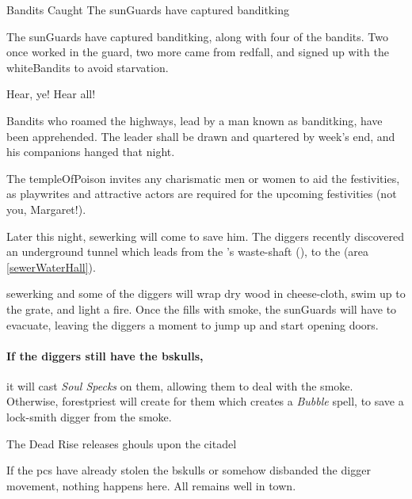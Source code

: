{Bandits Caught}%
{The \glspl{sunGuard} have captured \gls{banditking}}%

\label{banditsCaught}

The \glspl{sunGuard} have captured \gls{banditking}, along with four of the bandits.
Two once worked in the \gls{guard}, two more came from \gls{redfall}, and signed up with the \gls{whiteBandits} to avoid starvation.

\begin{speechtext}
  Hear, ye!  Hear all!

  Bandits who roamed the highways, lead by a man known as \gls{banditking}, have been apprehended.  The leader shall be drawn and quartered by week's end, and his companions hanged that night.

  The \gls{templeOfPoison} invites any charismatic men or women to aid the festivities, as playwrites and attractive actors are required for the upcoming festivities (not you, Margaret!).
\end{speechtext}


Later this night, \gls{sewerking} will come to save him.
The \glspl{digger} recently discovered an underground tunnel which leads from the 's waste-shaft (), to the  (area \vref{sewerWaterHall}).

\Gls{sewerking} and some of the \glspl{digger} will wrap dry wood in cheese-cloth, swim up to the grate, and light a fire.
Once the  fills with smoke, the \glspl{sunGuard} will have to evacuate, leaving the \glspl{digger} a moment to jump up and start opening doors.

\paragraph{If the \glspl{digger} still have the \gls{bskulls},}
it will cast \textit{Soul Specks} on them, allowing them to deal with the smoke.
Otherwise, \gls{forestpriest} will create  for them which creates a \textit{Bubble} spell, to save a lock-smith \gls{digger} from the smoke.

{The Dead Rise}%
{ releases ghouls upon the citadel}%

If the \glspl{pc} have already stolen the \gls{bskulls} or somehow disbanded the \gls{digger} movement, nothing happens here.
All remains well in \gls{town}.

